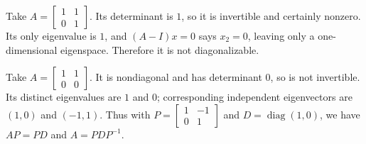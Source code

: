 Take $A=\left[\begin{smallmatrix}1&1\\0&1\end{smallmatrix}\right]$. Its determinant is $1$, so it is invertible and certainly nonzero. Its only eigenvalue is $1$, and $(A-I)x=0$ says $x_2=0$, leaving only a one-dimensional eigenspace. Therefore it is not diagonalizable.

Take $A=\left[\begin{smallmatrix}1&1\\0&0\end{smallmatrix}\right]$. It is nondiagonal and has determinant $0$, so is not invertible. Its distinct eigenvalues are $1$ and $0$; corresponding independent eigenvectors are $(1,0)$ and $(-1,1)$. Thus with $P=\left[\begin{smallmatrix}1&-1\\0&1\end{smallmatrix}\right]$ and $D=\operatorname{diag}(1,0)$, we have $AP=PD$ and $A=PDP^{-1}$.

